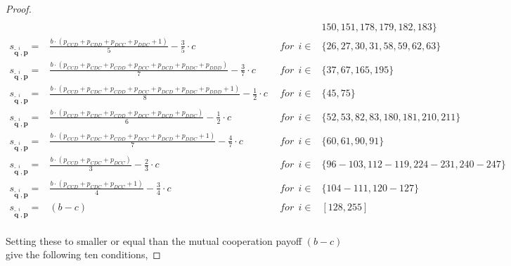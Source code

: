 \documentclass{article}
\theoremstyle{definition}
\begin{document}
\begin{proof}
{\begin{equation}
\begin{array}{lcll}
    \\ & & &  150, 151, 178, 179, 182, 183\} \\ 
    s_{\mathbf{\tilde{q}}^{i}, \mathbf{p}} = & \frac{b \cdot \left(p_{CCD} + p_{CDD} + p_{DCC} + p_{DDC} + 1\right)}{5} - \frac{3}{5} \cdot c & ~~for~~ i \in & \{ 26, 27, 30, 31, 58, 59, 62, 63\} \\ [0.2cm]
    s_{\mathbf{\tilde{q}}^{i}, \mathbf{p}} = & \frac{b \cdot \left(p_{CCD} + p_{CDC} + p_{CDD} + p_{DCC} + p_{DCD} + p_{DDC} + p_{DDD}\right)}{7}  - \frac{3}{7} \cdot c& ~~for~~ i \in & \{ 37, 67, 165, 195\} \\ [0.2cm]
    s_{\mathbf{\tilde{q}}^{i}, \mathbf{p}} = & \frac{b \cdot \left(p_{CCD} + p_{CDC} + p_{CDD} + p_{DCC} + p_{DCD} + p_{DDC} + p_{DDD} + 1\right)}{8} - \frac{1}{2} \cdot c & ~~for~~ i \in & \{ 45, 75\} \\ [0.2cm]
    s_{\mathbf{\tilde{q}}^{i}, \mathbf{p}} = & \frac{b \cdot \left(p_{CCD} + p_{CDC} + p_{CDD} + p_{DCC} + p_{DCD} + p_{DDC}\right)}{6} - \frac{1}{2} \cdot c & ~~for~~ i \in & \{ 52, 53, 82, 83, 180, 181, 210, 211\} \\  [0.2cm]
    s_{\mathbf{\tilde{q}}^{i}, \mathbf{p}} = & \frac{b \cdot \left(p_{CCD} + p_{CDC} + p_{CDD} + p_{DCC} + p_{DCD} + p_{DDC} + 1\right)}{7} - \frac{4}{7} \cdot c & ~~for~~ i \in & \{ 60, 61, 90, 91\} \\ [0.2cm]
    s_{\mathbf{\tilde{q}}^{i}, \mathbf{p}} = & \frac{b \cdot \left(p_{CCD} + p_{CDC} + p_{DCC}\right)}{3} - \frac{2}{3} \cdot c & ~~for~~ i \in & \{ 96\!- \!103, 112\!- \!119, 224\!- \!231, 240\!- \!247\} \\ [0.2cm]
    s_{\mathbf{\tilde{q}}^{i}, \mathbf{p}} = & \frac{b \cdot \left(p_{CCD} + p_{CDC} + p_{DCC} + 1\right)}{4} - \frac{3}{4} \cdot c & ~~for~~ i \in & \{ 104\!-\!111, 120\!- \!127\} \\ [0.2cm]
    s_{\mathbf{\tilde{q}}^{i}, \mathbf{p}} = & (b - c) & ~~for~~ i \in & [128, 255] \\
\end{array}
\end{equation}}

Setting these to smaller or equal than the mutual cooperation payoff $(b - c)$
give the following ten conditions,


\end{proof}
\end{document}
